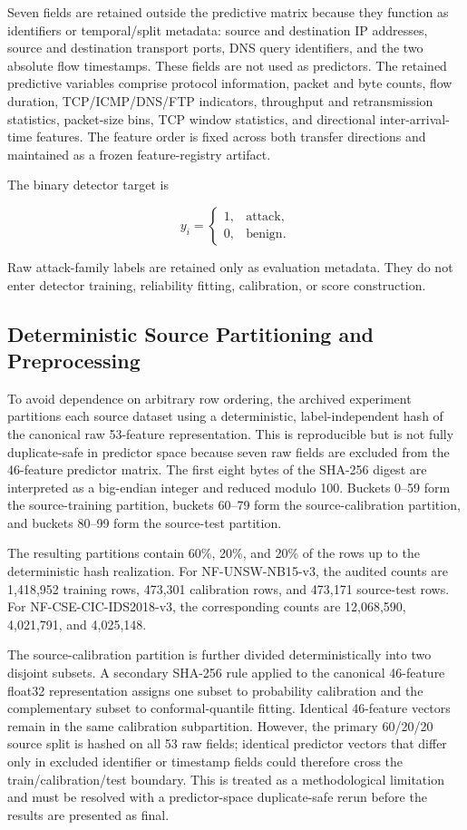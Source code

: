 \documentclass[conference]{IEEEtran}
\begin{document}
Seven fields are retained outside the predictive matrix because they function as identifiers or temporal/split metadata: source and destination IP addresses, source and destination transport ports, DNS query identifiers, and the two absolute flow timestamps. These fields are not used as predictors. The retained predictive variables comprise protocol information, packet and byte counts, flow duration, TCP/ICMP/DNS/FTP indicators, throughput and retransmission statistics, packet-size bins, TCP window statistics, and directional inter-arrival-time features. The feature order is fixed across both transfer directions and maintained as a frozen feature-registry artifact.

The binary detector target is

\[
y_i =
\begin{cases}
1, & \text{attack},\\
0, & \text{benign}.
\end{cases}
\]

Raw attack-family labels are retained only as evaluation metadata. They do not enter detector training, reliability fitting, calibration, or score construction.

\subsection{Deterministic Source Partitioning and Preprocessing}

To avoid dependence on arbitrary row ordering, the archived experiment partitions each source dataset using a deterministic, label-independent hash of the canonical raw 53-feature representation. This is reproducible but is not fully duplicate-safe in predictor space because seven raw fields are excluded from the 46-feature predictor matrix. The first eight bytes of the SHA-256 digest are interpreted as a big-endian integer and reduced modulo 100. Buckets 0--59 form the source-training partition, buckets 60--79 form the source-calibration partition, and buckets 80--99 form the source-test partition.

The resulting partitions contain 60\%, 20\%, and 20\% of the rows up to the deterministic hash realization. For NF-UNSW-NB15-v3, the audited counts are 1,418,952 training rows, 473,301 calibration rows, and 473,171 source-test rows. For NF-CSE-CIC-IDS2018-v3, the corresponding counts are 12,068,590, 4,021,791, and 4,025,148.

The source-calibration partition is further divided deterministically into two disjoint subsets. A secondary SHA-256 rule applied to the canonical 46-feature float32 representation assigns one subset to probability calibration and the complementary subset to conformal-quantile fitting. Identical 46-feature vectors remain in the same calibration subpartition. However, the primary 60/20/20 source split is hashed on all 53 raw fields; identical predictor vectors that differ only in excluded identifier or timestamp fields could therefore cross the train/calibration/test boundary. This is treated as a methodological limitation and must be resolved with a predictor-space duplicate-safe rerun before the results are presented as final.
\end{document}
